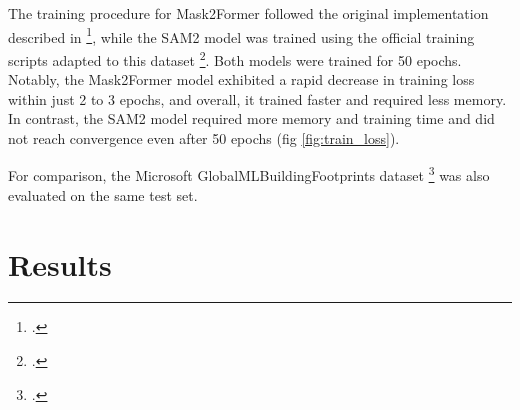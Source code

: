 \begin{refsection}
The training procedure for Mask2Former followed the original implementation described in \footcite{cheng_masked-attention_2022}, while the SAM2 model was trained using the official training scripts adapted to this dataset \footcite{ravi_sam_2024}. Both models were trained for 50 epochs. Notably, the Mask2Former model exhibited a rapid decrease in training loss within just 2 to 3 epochs, and overall, it trained faster and required less memory. In contrast, the SAM2 model required more memory and training time and did not reach convergence even after 50 epochs (fig \ref{fig:train_loss}).

For comparison, the Microsoft GlobalMLBuildingFootprints dataset \footcite{microsoft_globalmlbuildingfootprints_2024} was also evaluated on the same test set.

\renewcommand{\sectionnametext}{Results}
\renewcommand{\headingtextR}{\thesection. \sectionnametext}
\section{\sectionnametext}



\end{refsection}
